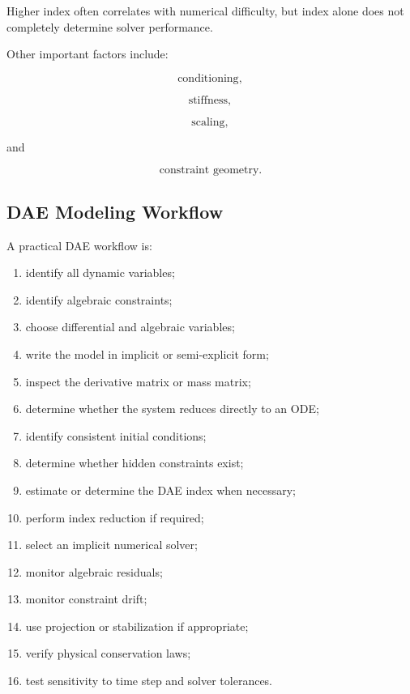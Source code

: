 Higher index often correlates with numerical difficulty, but index alone
does not completely determine solver performance.

Other important factors include:

\[
\boxed{
\text{conditioning},
}
\]

\[
\boxed{
\text{stiffness},
}
\]

\[
\boxed{
\text{scaling},
}
\]

and

\[
\boxed{
\text{constraint geometry}.
}
\]

\subsection{DAE Modeling Workflow}
\label{subsec:dae-modeling-workflow}

A practical DAE workflow is:

\begin{enumerate}
    \item identify all dynamic variables;
    \item identify algebraic constraints;
    \item choose differential and algebraic variables;
    \item write the model in implicit or semi-explicit form;
    \item inspect the derivative matrix or mass matrix;
    \item determine whether the system reduces directly to an ODE;
    \item identify consistent initial conditions;
    \item determine whether hidden constraints exist;
    \item estimate or determine the DAE index when necessary;
    \item perform index reduction if required;
    \item select an implicit numerical solver;
    \item monitor algebraic residuals;
    \item monitor constraint drift;
    \item use projection or stabilization if appropriate;
    \item verify physical conservation laws;
    \item test sensitivity to time step and solver tolerances.
\end{enumerate}

